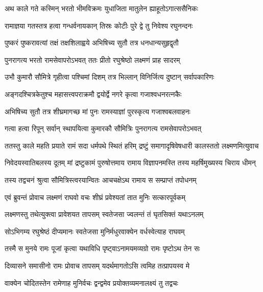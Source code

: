 

\twolineshloka
{अथ काले गते कस्मिन् भरतो भीमविक्रमः}
{युधाजिता मातुलेन ह्याहूतोऽगात्ससैनिकः} %

\twolineshloka
{रामाज्ञया गतस्तत्र हत्वा गन्धर्वनायकान्}
{तिस्रः कोटीः पुरे द्वे तु निवेश्य रघुनन्दनः} %

\twolineshloka
{पुष्करं पुष्करावत्यां तक्षं तक्षशिलाह्वये}
{अभिषिच्य सुतौ तत्र धनधान्यसुहृद्वृतौ} %

\twolineshloka
{पुनरागत्य भरतो रामसेवापरोऽभवत्}
{ततः प्रीतो रघुश्रेष्ठो लक्ष्मणं प्राह सादरम्} %

\twolineshloka
{उभौ कुमारौ सौमित्रे गृहीत्वा पश्चिमां दिशम्}
{तत्र भिल्लान् विनिर्जित्य दुष्टान् सर्वापकारिणः} %

\twolineshloka
{अङ्गदश्चित्रकेतुश्च महासत्त्वपराक्रमौ}
{द्वयोर्द्वे नगरे कृत्वा गजाश्वधनरत्नकैः} %

\twolineshloka
{अभिषिच्य सुतौ तत्र शीघ्रमागच्छ मां पुनः}
{रामस्याज्ञां पुरस्कृत्य गजाश्वबलवाहनः} %

\twolineshloka
{गत्वा हत्वा रिपून् सर्वान् स्थापयित्वा कुमारकौ}
{सौमित्रिः पुनरागत्य रामसेवापरोऽभवत्} %

\fourlineindentedshloka
{ततस्तु काले महति प्रयाते}
{रामं सदा धर्मपथे स्थितं हरिम्}
{द्रष्टुं समागादृषिवेषधारी}
{कालस्ततो लक्ष्मणमित्युवाच} %

\fourlineindentedshloka
{निवेदयस्वातिबलस्य दूतम्}
{मां द्रष्टुकामं पुरुषोत्तमाय}
{रामाय विज्ञापनमस्ति तस्य}
{महर्षिमुख्यस्य चिराय धीमन्} %

\twolineshloka
{तस्य तद्वचनं श्रुत्वा सौमित्रिस्त्वरयान्वितः}
{आचचक्षेऽथ रामाय स सम्प्राप्तं तपोधनम्} %

\twolineshloka
{एवं ब्रुवन्तं प्रोवाच लक्ष्मणं राघवो वचः}
{शीघ्रं प्रवेश्यतां तात मुनिः सत्कारपूर्वकम्} %

\twolineshloka
{लक्ष्मणस्तु तथेत्युक्त्वा प्रावेशयत तापसम्}
{स्वतेजसा ज्वलन्तं तं घृतसिक्तं यथाऽनलम्} %

\twolineshloka
{सोऽभिगम्य रघुश्रेष्ठं दीप्यमानः स्वतेजसा}
{मुनिर्मधुरवाक्येन वर्धस्वेत्याह राघवम्} %

\twolineshloka
{तस्मै स मुनये रामः पूजां कृत्वा यथाविधि}
{पृष्ट्वाऽनामयमव्यग्रो रामः पृष्टोऽथ तेन सः} %

\twolineshloka
{दिव्यासने समासीनो रामः प्रोवाच तापसम्}
{यदर्थमागतोऽसि त्वमिह तत्प्रापयस्व मे} %

\twolineshloka
{वाक्येन चोदितस्तेन रामेणाह मुनिर्वचः}
{द्वन्द्वमेव प्रयोक्तव्यमनालक्ष्यं तु तद्वचः} %

